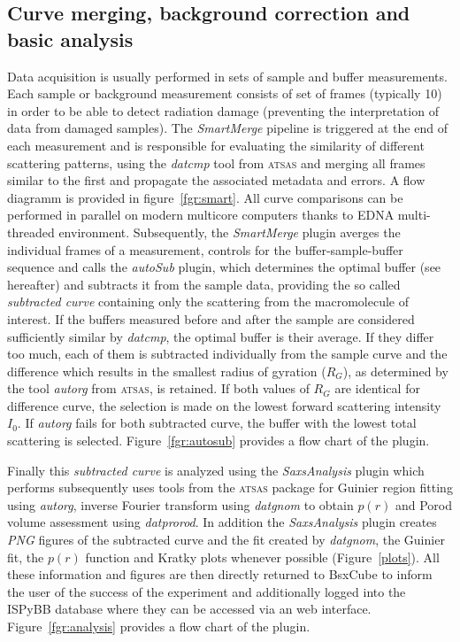 \documentclass[preprint,pdf]{iucr}              %
\begin{document}
\subsection{Curve merging, background correction and basic analysis}
\label{SM}
Data acquisition is usually performed  in sets of sample and buffer measurements. 
Each sample or background measurement consists of set of frames
(typically 10) in order to be able to detect radiation damage 
(preventing the interpretation of data from damaged samples).
The \textit{SmartMerge} pipeline is triggered at the end of each measurement
and is responsible for evaluating the similarity of different scattering
patterns, using the \textit{datcmp} tool from \textsc{atsas} and merging all frames
similar to the first and propagate the associated metadata and errors.
A flow diagramm is provided in figure~\ref{fgr:smart}.
All curve comparisons can be performed in parallel on modern multicore
computers thanks to EDNA multi-threaded environment.
Subsequently, the \textit{SmartMerge} plugin averges the individual frames 
of a measurement, controls for the buffer-sample-buffer sequence and 
 calls the \textit{autoSub} plugin, which determines the optimal buffer
(see hereafter) and subtracts it from the sample data,  providing the so called
\textit{subtracted curve} containing only the scattering from the macromolecule
of interest.
If the buffers measured before and after the sample are considered sufficiently
similar by \textit{datcmp}, the optimal buffer is their average.
If they differ too much, each of them is subtracted individually from the
sample curve and the difference which results in  the smallest radius of gyration ($R_{G}$),
as determined by the tool \textit{autorg} from \textsc{atsas}, is retained.
If both values of $R_{G}$ are identical for difference curve, the selection is made on the lowest forward scattering intensity $I_{0}$. 
If \textit{autorg} fails for both subtracted curve, the buffer with the lowest total scattering is selected. 
Figure~\ref{fgr:autosub} provides a flow chart of the plugin.

Finally this \textit{subtracted curve} is analyzed using the
\textit{SaxsAnalysis} plugin which performs subsequently uses tools from the \textsc{atsas} package for Guinier region fitting
using \textit{autorg}, inverse Fourier transform using \textit{datgnom} to obtain
$p(r)$ and Porod volume assessment using \textit{datprorod}.
In addition the \textit{SaxsAnalysis} plugin creates \textit{PNG} figures of
the subtracted curve and the fit created by \textit{datgnom}, the Guinier fit,
the $p(r)$ function and Kratky plots whenever possible (Figure~\ref{plots}).
All these information and figures are then directly returned to BsxCube to inform the user
of the success of the experiment and additionally logged into the ISPyBB
database \cite{ISPYBB} where they can be accessed via an web interface.
Figure~\ref{fgr:analysis} provides a flow chart of the plugin.
\end{document}

